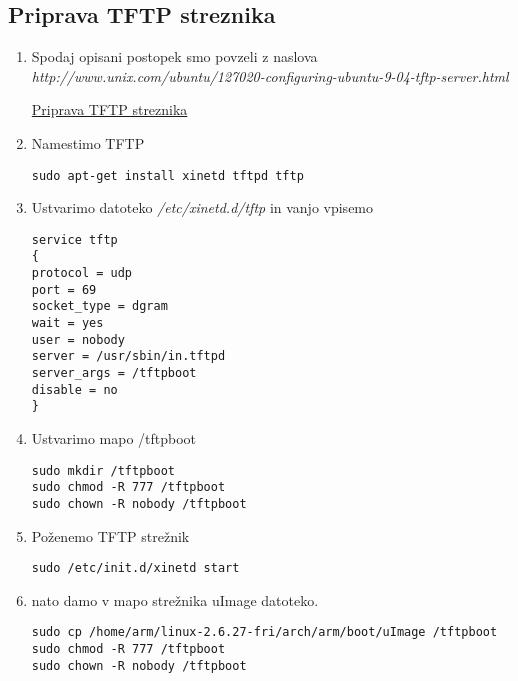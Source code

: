 \documentclass[10pt,a4paper]{article}
\begin{document}
\subsection{Priprava TFTP streznika}
\begin{enumerate}
	\item Spodaj opisani postopek smo povzeli z naslova \\ \emph{http://www.unix.com/ubuntu/127020-configuring-ubuntu-9-04-tftp-server.html}
		\begin{center}
			\href{http://www.unix.com/ubuntu/127020-configuring-ubuntu-9-04-tftp-server.html}{Priprava TFTP streznika}
		\end{center}
	\item Namestimo TFTP
		\begin{lstlisting}
sudo apt-get install xinetd tftpd tftp
		\end{lstlisting}
	\item Ustvarimo datoteko \emph{/etc/xinetd.d/tftp} in vanjo vpisemo
		\begin{lstlisting}
service tftp
{
protocol = udp
port = 69
socket_type = dgram
wait = yes
user = nobody
server = /usr/sbin/in.tftpd
server_args = /tftpboot
disable = no
}
		\end{lstlisting}
	\item Ustvarimo mapo /tftpboot
		\begin{lstlisting}
sudo mkdir /tftpboot
sudo chmod -R 777 /tftpboot
sudo chown -R nobody /tftpboot
		\end{lstlisting}
	\item Poženemo TFTP strežnik
		\begin{lstlisting}
sudo /etc/init.d/xinetd start
		\end{lstlisting}
	\item nato damo v mapo strežnika uImage datoteko.
		\begin{lstlisting}
sudo cp /home/arm/linux-2.6.27-fri/arch/arm/boot/uImage /tftpboot
sudo chmod -R 777 /tftpboot
sudo chown -R nobody /tftpboot
		\end{lstlisting}
\end{enumerate}
\end{document}
